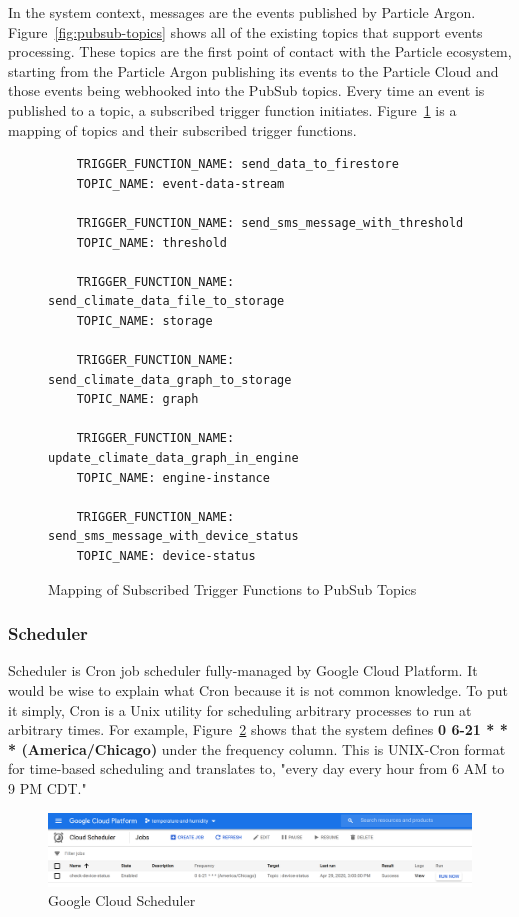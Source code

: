 \documentclass{article}
\begin{document}
In the system context, messages are the events published by Particle Argon. Figure~\ref{fig:pubsub-topics} shows all of the existing topics that support events processing. These topics are the first point of contact with the Particle ecosystem, starting from the Particle Argon publishing its events to the Particle Cloud and those events being webhooked into the PubSub topics. Every time an event is published to a topic, a subscribed trigger function initiates. Figure~\ref{fig:mapping} is a mapping of topics and their subscribed trigger functions.\\

\begin{figure}[H]
	\begin{lstlisting}
    TRIGGER_FUNCTION_NAME: send_data_to_firestore
    TOPIC_NAME: event-data-stream

    TRIGGER_FUNCTION_NAME: send_sms_message_with_threshold
    TOPIC_NAME: threshold

    TRIGGER_FUNCTION_NAME: send_climate_data_file_to_storage
    TOPIC_NAME: storage

    TRIGGER_FUNCTION_NAME: send_climate_data_graph_to_storage
    TOPIC_NAME: graph

    TRIGGER_FUNCTION_NAME: update_climate_data_graph_in_engine
    TOPIC_NAME: engine-instance

    TRIGGER_FUNCTION_NAME: send_sms_message_with_device_status
    TOPIC_NAME: device-status
    \end{lstlisting}
	\caption{Mapping of Subscribed Trigger Functions to PubSub Topics}
	\label{fig:mapping}
\end{figure}

\subsubsection{Scheduler}
\label{section:scheduler}
Scheduler is Cron job scheduler fully-managed by Google Cloud Platform. It would be wise to explain what Cron because it is not common knowledge. To put it simply, Cron is a Unix utility for scheduling arbitrary processes to run at arbitrary times. For example, Figure~\ref{fig:scheduler} shows that the system defines \textbf{0 6-21 * * * (America/Chicago)} under the frequency column. This is UNIX-Cron format for time-based scheduling and translates to, "every day every hour from 6 AM to 9 PM CDT."

\begin{figure}[H]
	\center
	\includegraphics[width=\textwidth]{images/scheduler.png}
	\caption{Google Cloud Scheduler}
	\label{fig:scheduler}
\end{figure}
\end{document}
